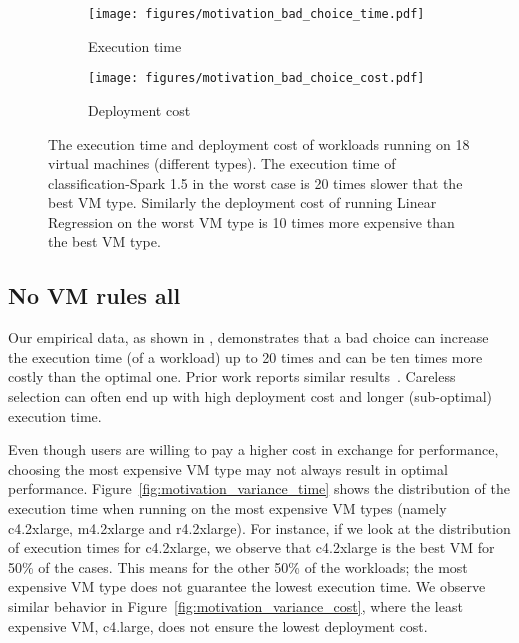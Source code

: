 \begin{figure}
\centering
\begin{subfigure}[b]{0.45\textwidth}
    \texttt{[image: figures/motivation\_bad\_choice\_time.pdf]}
    \caption{Execution time}
    \label{fig:motivation_bad_choice_time}
\end{subfigure}
\hfill
\begin{subfigure}[b]{0.45\textwidth}
    \texttt{[image: figures/motivation\_bad\_choice\_cost.pdf]}
    \caption{Deployment cost}
    \label{fig:motivation_bad_choice_cost}
\end{subfigure}
\caption{The execution time and deployment cost of workloads running on 18 virtual machines (different types). The execution time of classification-Spark 1.5 in the worst case is 20 times slower that the best VM type. Similarly the deployment cost of running Linear Regression on the worst VM type is 10 times more expensive than the best VM type.}
\label{fig:motivation_bad_choice}
\end{figure}



\subsection*{No VM rules all}
Our empirical data, as shown in \myfigure{\ref{fig:motivation_bad_choice}}, demonstrates that
a bad choice can increase the execution time (of a workload) up to 20 times and can be ten times more costly than the optimal one.
Prior work reports similar results~\cite{Alipourfard2017, Yadwadkar2017}. Careless selection can often end up
with high deployment cost and longer (sub-optimal) execution time.

Even though users are willing to pay a higher cost in exchange for performance, choosing the most expensive VM type may not always result in optimal performance. Figure~\ref{fig:motivation_variance_time} shows the distribution of the execution time when running on the most expensive VM types  (namely c4.2xlarge, m4.2xlarge and r4.2xlarge). For instance, if we look at the distribution of execution times for c4.2xlarge, we observe that c4.2xlarge is the best VM for 50\% of the cases. This means for the other 50\% of the workloads; the most expensive VM type does not guarantee the lowest execution time. We observe similar behavior in Figure~\ref{fig:motivation_variance_cost}, where the least expensive VM, c4.large, does not ensure the lowest deployment cost.

